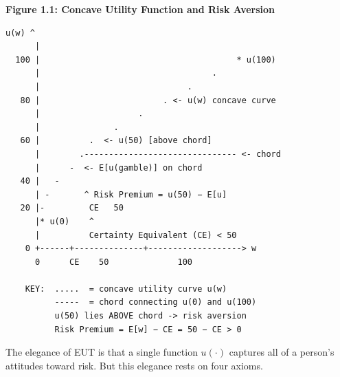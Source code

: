 \documentclass[12pt, letterpaper]{article}
\begin{document}
\textbf{Figure 1.1: Concave Utility Function and Risk Aversion}

\begin{lstlisting}[caption={}]
u(w) ^
      |
  100 |                                        * u(100)
      |                                   .
      |                              .
   80 |                         . <- u(w) concave curve
      |                    .
      |               .
   60 |          .  <- u(50) [above chord]
      |        .------------------------------- <- chord
      |      -  <- E[u(gamble)] on chord
   40 |   -
      | -       ^ Risk Premium = u(50) − E[u]
   20 |-         CE   50
      |* u(0)    ^
      |          Certainty Equivalent (CE) < 50
    0 +------+--------------+-------------------> w
      0      CE    50              100

    KEY:  .....  = concave utility curve u(w)
          -----  = chord connecting u(0) and u(100)
          u(50) lies ABOVE chord -> risk aversion
          Risk Premium = E[w] − CE = 50 − CE > 0
\end{lstlisting}


\begin{table}[H]
\centering
\small
{}
\end{table}


The elegance of EUT is that a single function $u(\cdot)$ captures all of a person's attitudes toward risk. But this elegance rests on four axioms.

\medskip
\end{document}
